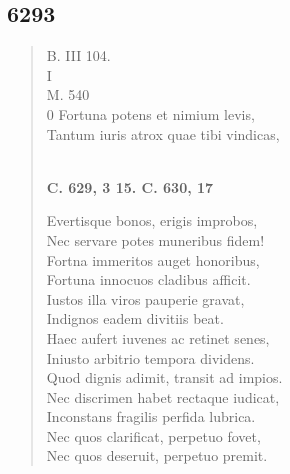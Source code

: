 \documentclass[11pt, a4paper]{report}
\begin{document}
            \subsection*{6293}
      \begin{verse}
      B. III 104. \\ I \\ M. 540 \\ 0 Fortuna potens et nimium levis, \\ Tantum iuris atrox quae tibi vindicas, \\ 
        ﻿\pagebreak 
    \begin{center} \textbf{C. 629, 3 15. C. 630, 17} \end{center} \marginpar{[97]} Evertisque bonos, erigis improbos, \\ Nec servare potes muneribus fidem! \\ Fortna immeritos auget honoribus, \\ Fortuna innocuos cladibus afficit. \\ Iustos illa viros pauperie gravat, \\ Indignos eadem divitiis beat. \\ Haec aufert iuvenes ac retinet senes, \\ Iniusto arbitrio tempora dividens. \\ Quod dignis adimit, transit ad impios. \\ Nec discrimen habet rectaque iudicat, \\ Inconstans fragilis perfida lubrica. \\ Nec quos clarificat, perpetuo fovet, \\ Nec quos deseruit, perpetuo premit. \\ 
      \end{verse}
  
\end{document}
